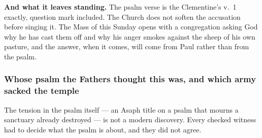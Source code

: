 \textbf{And what it leaves standing.} The psalm verse is the Clementine's
v.~1 exactly, question mark included. The Church does not soften the
accusation before singing it. The Mass of this Sunday opens with a
congregation asking God why he has cast them off and why his anger smokes
against the sheep of his own pasture, and the answer, when it comes, will come
from Paul rather than from the psalm.

\subsubsection*{Whose psalm the Fathers thought this was, and which army sacked
the temple}

The tension in the psalm itself --- an Asaph title on a psalm that mourns a
sanctuary already destroyed --- is not a modern discovery. Every checked
witness had to decide what the psalm is about, and they did not agree.

